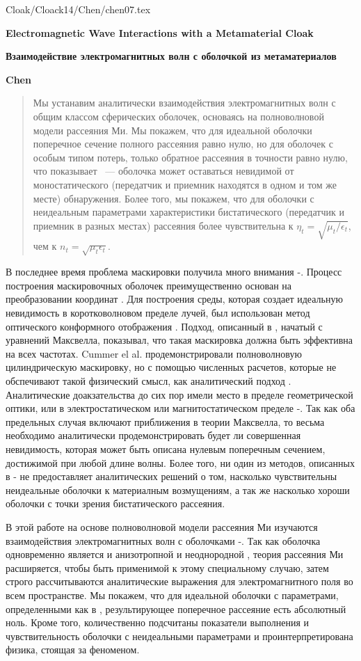 \documentclass[a4paper, 12pt]{article}
\newcommand{\tit}[1]{\begin{center}{\bf{\Large #1}}\end{center}}
\newcommand{\aut}[1]{\centerline{{\bf #1}}}
\begin{document}
Cloak/Cloack14/Chen/chen07.tex

\sloppy
\tit{Electromagnetic Wave Interactions with a Metamaterial Cloak}
\tit{Взаимодействие электромагнитных волн с оболочкой из метаматериалов}
\aut{Chen}

\begin{abstract}
Мы устанавим аналитически взаимодействия электромагнитных волн с общим
классом сферических оболочек, основаясь на полноволновой модели рассеяния Ми.
Мы покажем, что для идеальной оболочки поперечное сечение полного рассеяния равно
нулю, но для оболочек с особым типом потерь, только обратное рассеяния в точности 
равно нулю, что показывает ~--- оболочка может оставаться невидимой от 
моностатического (передатчик и приемник находятся в одном и том же месте) 
обнаружения. Более того, мы покажем, что для оболочки с неидеальным параметрами
характеристики бистатического (передатчик и приемник в разных местах) рассеяния
более чувствительна к $\eta_t=\sqrt{\mu_t/\epsilon_t}$, чем
к $n_t=\sqrt{\mu_t\epsilon_t}$.
\end{abstract}


В последнее время проблема маскировки получила много внимания \cite{1}-\cite{11}.
Процесс построения маскировочных оболочек преимущественно основан на 
преобразовании координат \cite{4}. 
Для построения среды, которая создает идеальную невидимость в коротковолновом 
пределе лучей, был использован метод оптического конформного отображения 
\cite{6}. Подход, описанный в \cite{4}, начатый с уравнений Максвелла, 
показывал, что такая маскировка должна быть эффективна на всех частотах. 
Cummer el al. продемонстрировали полноволновую цилиндрическую маскировку, но с 
помощью численных расчетов, которые не обспечивают такой физический смысл, как 
аналитический подход \cite{2}. Аналитические доакзательства до сих пор 
имели место в пределе геометрической оптики, или в электростатическом или 
магнитостатическом пределе \cite{4}-\cite{6}. 
Так как оба предельных случая включают приближения в теории Максвелла, то весьма 
необходимо аналитически продемонстрировать
будет ли совершенная невидимость, которая может быть описана
нулевым поперечным сечением, достижимой при любой длине волны.  
Более того, ни один из методов, описанных в \cite{4}-\cite{6} 
не предоставляет аналитических решений о том, насколько чувствительны неидеальные 
оболочки к материалным возмущениям, а так же насколько хороши оболочки с точки 
зрения бистатического рассеяния.

В этой работе на основе полноволновой модели рассеяния Ми изучаются 
взаимодействия электромагнитных волн с оболочками \cite{12}-\cite{14}. 
Так как оболочка
одновременно является и анизотропной и неоднородной \cite{4}, теория рассеяния
Ми расширяется, чтобы быть применимой к этому специальному случаю, затем строго
рассчитываются аналитические выражения для электромагнитного поля во всем 
пространстве. 
Мы покажем, что для идеальной оболочки с параметрами, определенными
как в \cite{4}, результирующее поперечное рассеяние есть абсолютный ноль. 
Кроме того, количественно подсчитаны показатели выполнения и чувствительность 
оболочки с неидеальными параметрами и проинтерпретирована физика, стоящая за 
феноменом.
\end{document}
